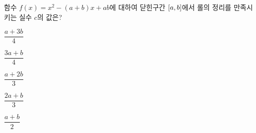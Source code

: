 함수 $f(x)=x^2-(a+b)x+ab$에 대하여 닫힌구간 $[a{,}\mkern3mu\mathopen{}b]$에서 롤의 정리를 만족시키는 실수 $c$의 값은?
\begin{choices32}{\rule[-3ex]{0pt}{8ex}$\dfrac{a+3b}{4}$}{\rule[-3ex]{0pt}{8ex}$\dfrac{3a+b}{4}$}{\rule[-3ex]{0pt}{8ex}$\dfrac{a+2b}{3}$}{\rule[-3ex]{0pt}{8ex}$\dfrac{2a+b}{3}$}{\rule[-3ex]{0pt}{8ex}$\dfrac{a+b}{2}$}\end{choices32}
